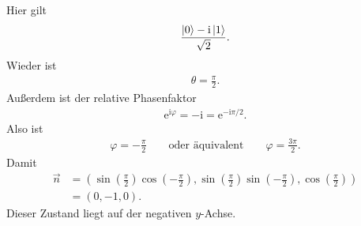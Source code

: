 \documentclass[11pt,a4paper]{scrartcl}
\newcommand{\e}{\mathrm e}
\newcommand{\ii}{\mathrm i}
\begin{document}
\begin{enumerate}[label=(\alph*)]
\begin{calculationbox}
            \begin{calculationbox}[title=Zustand $(\ket{0}-\ii\ket{1})/\sqrt2$]
                Hier gilt
                \begin{align*}
                    \frac{\ket{0}-\ii\ket{1}}{\sqrt2}.
                \end{align*}
                Wieder ist
                \begin{align*}
                    \theta=\frac{\pi}{2}.
                \end{align*}
                Außerdem ist der relative Phasenfaktor
                \begin{align*}
                    \e^{\ii\varphi}=-\ii
                    =
                    \e^{-\ii\pi/2}.
                \end{align*}
                Also ist
                \begin{align*}
                    \varphi=-\frac{\pi}{2}
                    \qquad
                    \text{oder äquivalent}
                    \qquad
                    \varphi=\frac{3\pi}{2}.
                \end{align*}
                Damit
                \begin{align*}
                    \vec n
                    &=
                    \left(
                        \sin\left(\frac{\pi}{2}\right)\cos\left(-\frac{\pi}{2}\right),
                        \sin\left(\frac{\pi}{2}\right)\sin\left(-\frac{\pi}{2}\right),
                        \cos\left(\frac{\pi}{2}\right)
                    \right)\\
                    &=
                    (0,-1,0).
                \end{align*}
                Dieser Zustand liegt auf der negativen $y$-Achse.
            \end{calculationbox}


\end{calculationbox}
\end{enumerate}
\end{document}
